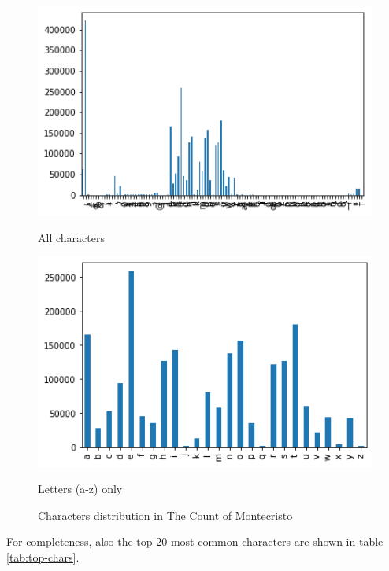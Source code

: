 \documentclass[12pt]{article}
\begin{document}
\begin{figure}[H]
	\centering
	\begin{minipage}{0.5\textwidth}
		\centering
		\includegraphics[width=1\textwidth]{images/10_distribution_chars.png} %
		\label{fig:distr-chars}
		\caption{All characters}
	\end{minipage}\hfill
	\begin{minipage}{0.5\textwidth}
		\centering
		\includegraphics[width=1\textwidth]{images/11_distribution_letters.png} %
		\label{fig:distr-letters}
		\caption{Letters (a-z) only}
	\end{minipage}
	\caption{Characters distribution in The Count of Montecristo}
\end{figure}

For completeness, also the top 20 most common characters are shown in table \ref{tab:top-chars}.
\end{document}
